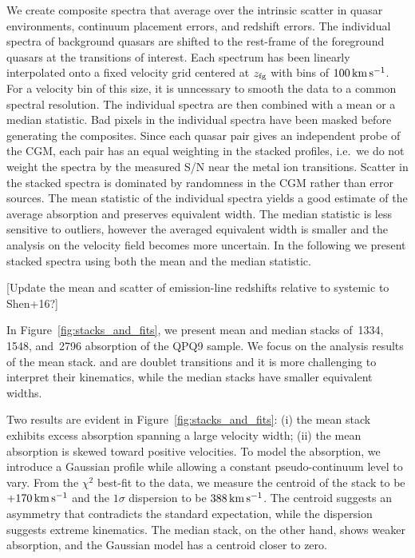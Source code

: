 \documentclass[iop]{emulateapj}
\begin{document}
We create composite spectra that average over the intrinsic scatter in quasar environments, 
continuum placement errors, and redshift errors. The individual spectra of background quasars are 
shifted to the rest-frame of the foreground quasars at the transitions of interest. Each spectrum 
has been linearly interpolated onto a fixed velocity grid centered at $z_{\rm fg}$ with bins of 
$100\,{\rm km\,s^{-1}}$. For a velocity bin of this size, it is unncessary to smooth the data to a 
common spectral resolution. The individual spectra are then combined with a mean or a median 
statistic. Bad pixels in the individual spectra have been masked before generating the 
composites. Since each quasar pair gives an independent probe of the CGM, each pair has an equal 
weighting in the stacked profiles, i.e.\ we do not weight the spectra by the measured S/N near the 
metal ion transitions. Scatter in the stacked spectra is dominated by randomness in the CGM rather 
than error sources. The mean statistic of the individual spectra yields a good estimate of the 
average absorption and preserves equivalent width. The median statistic is less sensitive to 
outliers, however the averaged equivalent width is smaller and the analysis on the velocity field 
becomes more uncertain. In the following we present stacked spectra using both the mean and the 
median statistic. 

[Update the mean and scatter of emission-line redshifts relative to systemic to Shen+16?]

In Figure~\ref{fig:stacks_and_fits}, we present mean and median stacks of \,1334, 
\,1548, and \,2796 absorption of the QPQ9 sample. We focus on the 
analysis results of the  mean stack.  and  are doublet transitions 
and it is more challenging to interpret their kinematics, while the median stacks have smaller 
equivalent widths.  


Two results are evident in Figure~\ref{fig:stacks_and_fits}: (i) the mean  stack 
exhibits excess absorption spanning a large velocity width; (ii) the mean absorption is skewed 
toward positive velocities. To model the absorption, we introduce a Gaussian profile while 
allowing a constant pseudo-continuum level to vary. From the $\chi^2$ best-fit to the data, 
we measure the centroid of the  stack to be $+170\,{\rm km\,s^{-1}}$ and 
the $1\sigma$ dispersion to be $388\,{\rm km\,s^{-1}}$. The centroid suggests an asymmetry that 
contradicts the standard expectation, while the dispersion suggests extreme kinematics. The 
median stack, on the other hand, shows weaker absorption, and the Gaussian model has a centroid 
closer to zero. 
\end{document}

